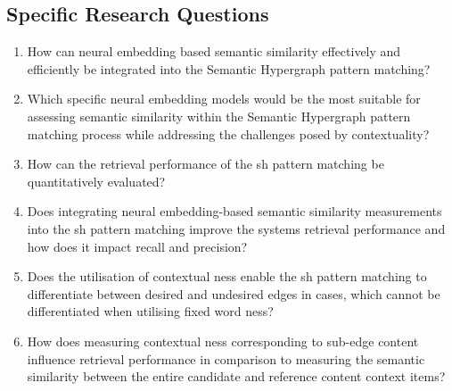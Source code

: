 \documentclass[11pt, numbers=noenddot]{scrreprt}
\begin{document}
\subsection{Specific Research Questions}
\begin{enumerate}[label=\textbf{R.\arabic*}, leftmargin=0pt, labelwidth=*, align=left, labelsep=0.5em, itemindent=0pt, listparindent=\parindent]
	\item How can neural embedding based semantic similarity effectively and efficiently be integrated into the Semantic Hypergraph pattern matching?

    \item Which specific neural embedding models would be the most suitable for assessing semantic similarity within the Semantic Hypergraph pattern matching process while addressing the challenges posed by contextuality?

	\item How can the retrieval performance of the \gls{sh} pattern matching be quantitatively evaluated?

    \item Does integrating neural embedding-based semantic similarity measurements into the \gls{sh} pattern matching improve the systems retrieval performance and how does it impact recall and precision?

    \item Does the utilisation of contextual \gls{ness} enable the \gls{sh} pattern matching to differentiate between desired and undesired edges in cases, which cannot be differentiated when utilising fixed word \gls{ness}?
    
    \item How does measuring contextual \gls{ness} corresponding to sub-edge content influence retrieval performance in comparison to measuring the semantic similarity between the entire candidate and reference content context items?


\end{enumerate}
\end{document}

